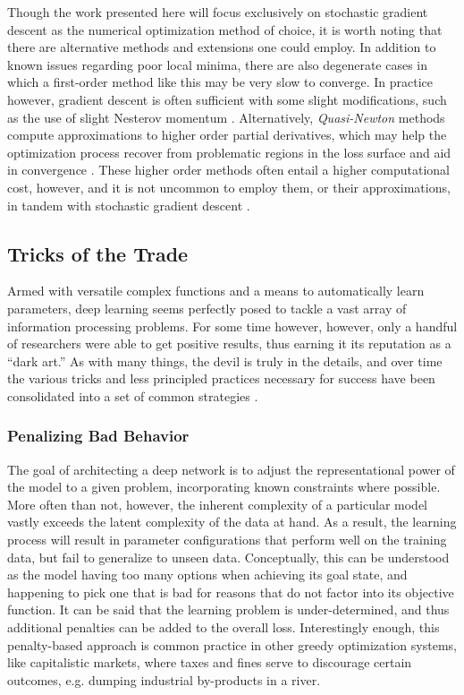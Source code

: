 Though the work presented here will focus exclusively on stochastic gradient descent as the numerical optimization method of choice, it is worth noting that there are alternative methods and extensions one could employ.
In addition to known issues regarding poor local minima, there are also degenerate cases in which a first-order method like this may be very slow to converge.
In practice however, gradient descent is often sufficient with some slight modifications, such as the use of slight Nesterov momentum \cite{Sutskever2013Importance}.
Alternatively, \emph{Quasi-Newton} methods compute approximations to higher order partial derivatives, which may help the optimization process recover from problematic regions in the loss surface and aid in convergence \cite{Liu1989Limited}.
These higher order methods often entail a higher computational cost, however, and it is not uncommon to employ them, or their approximations, in tandem with stochastic gradient descent \cite{Kavukcuoglu2010Learning}.


\subsection{Tricks of the Trade}
\label{subsec:tricks}

Armed with versatile complex functions and a means to automatically learn parameters, deep learning seems perfectly posed to tackle a vast array of information processing problems.
For some time however, however, only a handful of researchers were able to get positive results, thus earning it its reputation as a ``dark art.''
As with many things, the devil is truly in the details, and over time the various tricks and less principled practices necessary for success have been consolidated into a set of common strategies \cite{Bengio2012Practical}.

\subsubsection{Penalizing Bad Behavior}

The goal of architecting a deep network is to adjust the representational power of the model to a given problem, incorporating known constraints where possible.
More often than not, however, the inherent complexity of a particular model vastly exceeds the latent complexity of the data at hand.
As a result, the learning process will result in parameter configurations that perform well on the training data, but fail to generalize to unseen data.
Conceptually, this can be understood as the model having too many options when achieving its goal state, and happening to pick one that is bad for reasons that do not factor into its objective function.
It can be said that the learning problem is under-determined, and thus additional penalties can be added to the overall loss.
Interestingly enough, this penalty-based approach is common practice in other greedy optimization systems, like capitalistic markets, where taxes and fines serve to discourage certain outcomes, e.g. dumping industrial by-products in a river.

